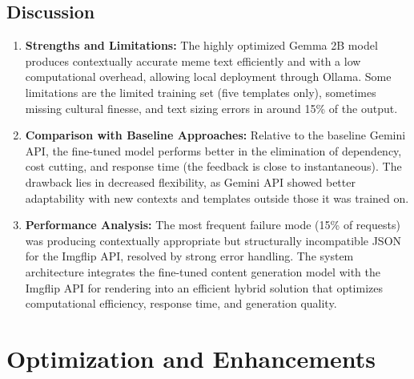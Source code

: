 \documentclass[conference]{IEEEtran}
\begin{document}
\subsection{Discussion}
\begin{enumerate}
    \item \textbf{Strengths and Limitations:} The highly optimized Gemma 2B model produces contextually accurate meme text efficiently and with a low computational overhead, allowing local deployment through Ollama. Some limitations are the limited training set (five templates only), sometimes missing cultural finesse, and text sizing errors in around 15\% of the output.
    \item \textbf{Comparison with Baseline Approaches:} Relative to the baseline Gemini API, the fine-tuned model performs better in the elimination of dependency, cost cutting, and response time (the feedback is close to instantaneous). The drawback lies in decreased flexibility, as Gemini API showed better adaptability with new contexts and templates outside those it was trained on.
    \item \textbf{Performance Analysis:} The most frequent failure mode (15\% of requests) was producing contextually appropriate but structurally incompatible JSON for the Imgflip API, resolved by strong error handling. The system architecture integrates the fine-tuned content generation model with the Imgflip API for rendering into an efficient hybrid solution that optimizes computational efficiency, response time, and generation quality.
\end{enumerate}

%

\section{Optimization and Enhancements}
\end{document}
